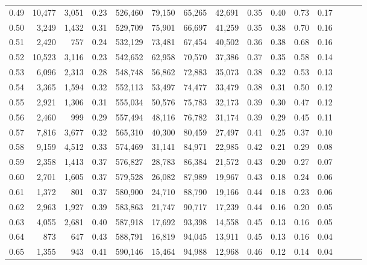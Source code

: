 \begin{tabular}{rrrrrrrrrrrrrrr}
0.49 &  10,477 &  3,051 &  0.23 &  526,460 &   79,150 &   65,265 &   42,691 &  0.35 &  0.40 &  0.73 &      0.17 \\
0.50 &   3,249 &  1,432 &  0.31 &  529,709 &   75,901 &   66,697 &   41,259 &  0.35 &  0.38 &  0.70 &      0.16 \\
0.51 &   2,420 &    757 &  0.24 &  532,129 &   73,481 &   67,454 &   40,502 &  0.36 &  0.38 &  0.68 &      0.16 \\
0.52 &  10,523 &  3,116 &  0.23 &  542,652 &   62,958 &   70,570 &   37,386 &  0.37 &  0.35 &  0.58 &      0.14 \\
0.53 &   6,096 &  2,313 &  0.28 &  548,748 &   56,862 &   72,883 &   35,073 &  0.38 &  0.32 &  0.53 &      0.13 \\
0.54 &   3,365 &  1,594 &  0.32 &  552,113 &   53,497 &   74,477 &   33,479 &  0.38 &  0.31 &  0.50 &      0.12 \\
0.55 &   2,921 &  1,306 &  0.31 &  555,034 &   50,576 &   75,783 &   32,173 &  0.39 &  0.30 &  0.47 &      0.12 \\
0.56 &   2,460 &    999 &  0.29 &  557,494 &   48,116 &   76,782 &   31,174 &  0.39 &  0.29 &  0.45 &      0.11 \\
0.57 &   7,816 &  3,677 &  0.32 &  565,310 &   40,300 &   80,459 &   27,497 &  0.41 &  0.25 &  0.37 &      0.10 \\
0.58 &   9,159 &  4,512 &  0.33 &  574,469 &   31,141 &   84,971 &   22,985 &  0.42 &  0.21 &  0.29 &      0.08 \\
0.59 &   2,358 &  1,413 &  0.37 &  576,827 &   28,783 &   86,384 &   21,572 &  0.43 &  0.20 &  0.27 &      0.07 \\
0.60 &   2,701 &  1,605 &  0.37 &  579,528 &   26,082 &   87,989 &   19,967 &  0.43 &  0.18 &  0.24 &      0.06 \\
0.61 &   1,372 &    801 &  0.37 &  580,900 &   24,710 &   88,790 &   19,166 &  0.44 &  0.18 &  0.23 &      0.06 \\
0.62 &   2,963 &  1,927 &  0.39 &  583,863 &   21,747 &   90,717 &   17,239 &  0.44 &  0.16 &  0.20 &      0.05 \\
0.63 &   4,055 &  2,681 &  0.40 &  587,918 &   17,692 &   93,398 &   14,558 &  0.45 &  0.13 &  0.16 &      0.05 \\
0.64 &     873 &    647 &  0.43 &  588,791 &   16,819 &   94,045 &   13,911 &  0.45 &  0.13 &  0.16 &      0.04 \\
0.65 &   1,355 &    943 &  0.41 &  590,146 &   15,464 &   94,988 &   12,968 &  0.46 &  0.12 &  0.14 &      0.04 \\

\end{tabular}
